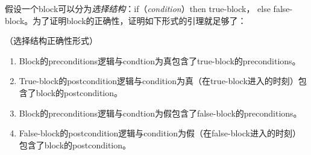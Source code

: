 假设一个block可以分为\emph{选择结构}：if（\emph{condition}）then true-block，
else false-block。为了证明block的正确性，证明如下形式的引理就足够了：

\begin{proposition}\label{Proposition:AlternationCorrectnessLemmaForm}
（选择结构正确性形式）
\begin{enumerate}
\item Block的preconditions逻辑与condtion为真包含了true-block的preconditions。
\item True-block的postcondition逻辑与condition为真（在true-block进入的时刻）包含了block的postcondition。
\item Block的preconditions逻辑与condtion为假包含了false-block的preconditions。
\item False-block的postcondition逻辑与condition为假（在false-block进入的时刻）包含了block的postcondition。
\end{enumerate}
\end{proposition}

